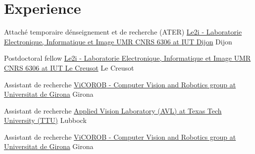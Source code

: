 
\section{Experience}

{Attach\'{e} temporaire d\'enseignement et de recherche (ATER)}
{\href{http://le2i.cnrs.fr/?lang=en}{Le2i - Laboratorie Electronique, Informatique et Image {UMR CNRS} 6306 at {IUT} Dijon}}
{}
{Dijon}
{}

{Postdoctoral fellow}
{\href{http://le2i.cnrs.fr/?lang=en}{Le2i - Laboratorie Electronique, Informatique et Image {UMR CNRS} 6306 at {IUT} Le Creusot}}
{}
{Le Creusot}
{}

{Assistant de recherche}
{\href{http://vicorob.udg.edu}{{ViCOROB} - Computer Vision and Robotics group at {U}niversitat de {G}irona}}
{}
{Girona}
{}

{Assistant de recherche}
{\href{http://www.depts.ttu.edu/ece/groups/appliedvision/}{Applied Vision Laboratory (AVL) at Texas Tech University (TTU)}}
{}
{Lubbock}
{}

{Assistant de recherche}
{\href{http://vicorob.udg.edu}{{ViCOROB} - Computer Vision and Robotics group at {U}niversitat de {G}irona}}
{}
{Girona}
{}


